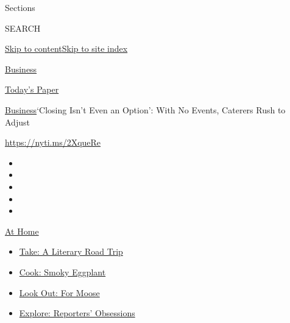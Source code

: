 Sections

SEARCH

\protect\hyperlink{site-content}{Skip to
content}\protect\hyperlink{site-index}{Skip to site index}

\href{https://www.nytimes3xbfgragh.onion/section/business}{Business}

\href{https://myaccount.nytimes3xbfgragh.onion/auth/login?response_type=cookie\&client_id=vi}{}

\href{https://www.nytimes3xbfgragh.onion/section/todayspaper}{Today's
Paper}

\href{/section/business}{Business}\textbar{}`Closing Isn't Even an
Option': With No Events, Caterers Rush to Adjust

\url{https://nyti.ms/2XqueRe}

\begin{itemize}
\item
\item
\item
\item
\item
\end{itemize}

\href{https://www.nytimes3xbfgragh.onion/spotlight/at-home?action=click\&pgtype=Article\&state=default\&region=TOP_BANNER\&context=at_home_menu}{At
Home}

\begin{itemize}
\tightlist
\item
  \href{https://www.nytimes3xbfgragh.onion/2020/07/28/books/time-for-a-literary-road-trip.html?action=click\&pgtype=Article\&state=default\&region=TOP_BANNER\&context=at_home_menu}{Take:
  A Literary Road Trip}
\item
  \href{https://www.nytimes3xbfgragh.onion/2020/07/29/magazine/bored-with-your-home-cooking-some-smoky-eggplant-will-fix-that.html?action=click\&pgtype=Article\&state=default\&region=TOP_BANNER\&context=at_home_menu}{Cook:
  Smoky Eggplant}
\item
  \href{https://www.nytimes3xbfgragh.onion/2020/07/27/travel/moose-michigan-isle-royale.html?action=click\&pgtype=Article\&state=default\&region=TOP_BANNER\&context=at_home_menu}{Look
  Out: For Moose}
\item
  \href{https://www.nytimes3xbfgragh.onion/interactive/2020/at-home/even-more-reporters-editors-diaries-lists-recommendations.html?action=click\&pgtype=Article\&state=default\&region=TOP_BANNER\&context=at_home_menu}{Explore:
  Reporters' Obsessions}
\end{itemize}

